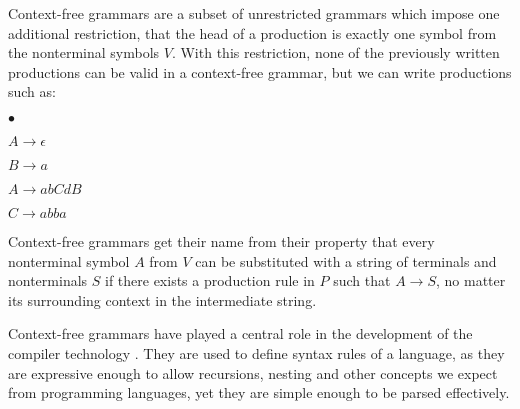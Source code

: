 Context-free grammars are a subset of unrestricted grammars which impose one additional restriction, that the head of a production is exactly one symbol from the nonterminal symbols $V$. With this restriction, none of the previously written productions can be valid in a context-free grammar, but we can write productions such as:
\begin{list}{$\bullet$}{}  	
	\item $A \rightarrow \epsilon$
	\item $B \rightarrow a$
	\item $A \rightarrow abCdB$
	\item $C \rightarrow abba$
\end{list}

Context-free grammars get their name from their property that every nonterminal symbol $A$ from $V$ can be substituted with a string of terminals and nonterminals $S$ if there exists a production rule in $P$ such that $A \rightarrow S$, no matter its surrounding context in the intermediate string.

Context-free grammars have played a central role in the development of the compiler technology \citep{hopcroft2007automatatheory}. They are used to define syntax rules of a language, as they are expressive enough to allow recursions, nesting and other concepts we expect from programming languages, yet they are simple enough to be parsed effectively.